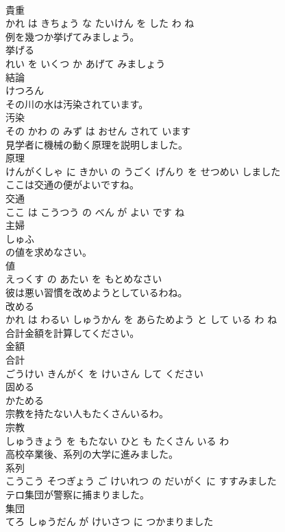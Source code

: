 \documentclass[8pt]{extreport}
\begin{document}
\begin{CJK}{UTF8}{min}
\\	貴重 
\\	かれ は きちょう な たいけん を した わ ね		
\\	例を幾つか挙げてみましょう。	
\\	挙げる 
\\	れい を いくつ か あげて みましょう		
\\	結論	
\\	けつろん		
\\	その川の水は汚染されています。	
\\	汚染 
\\	その かわ の みず は おせん されて います		
\\	見学者に機械の動く原理を説明しました。	
\\	原理 
\\	けんがくしゃ に きかい の うごく げんり を せつめい しました		
\\	ここは交通の便がよいですね。	
\\	交通 
\\	ここ は こうつう の べん が よい です ね		
\\	主婦	
\\	しゅふ		
\\	の値を求めなさい。	
\\	値 
\\	えっくす の あたい を もとめなさい		
\\	彼は悪い習慣を改めようとしているわね。	
\\	改める 
\\	かれ は わるい しゅうかん を あらためよう と して いる わ ね		
\\	合計金額を計算してください。	
\\	金額 
\\	合計 
\\	ごうけい きんがく を けいさん して ください		
\\	固める	
\\	かためる		
\\	宗教を持たない人もたくさんいるわ。	
\\	宗教 
\\	しゅうきょう を もたない ひと も たくさん いる わ		
\\	高校卒業後、系列の大学に進みました。	
\\	系列 
\\	こうこう そつぎょう ご けいれつ の だいがく に すすみました		
\\	テロ集団が警察に捕まりました。	
\\	集団 
\\	てろ しゅうだん が けいさつ に つかまりました		

\end{CJK}
\end{document}
